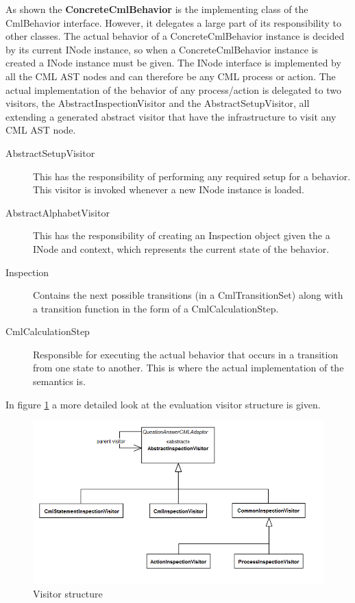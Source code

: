 \documentclass[a4paper, 10pt]{include/compassreport}   %
\begin{document}
As shown the \textbf{ConcreteCmlBehavior} is the implementing class of
the CmlBehavior interface. However, it delegates a large part of its
responsibility to other classes. The actual behavior of a
ConcreteCmlBehavior instance is decided by its current INode instance,
so when a ConcreteCmlBehavior instance is created a INode instance
must be given. The INode interface is implemented by all the CML AST
nodes and can therefore be any CML process or action.  The actual
implementation of the behavior of any process/action is delegated to
two visitors, the AbstractInspectionVisitor and the
AbstractSetupVisitor, all extending a generated abstract visitor that
have the infrastructure to visit any CML AST node.

\begin{description}
\item[AbstractSetupVisitor] This has the responsibility of performing
  any required setup for a behavior. This visitor is invoked
  whenever a new INode instance is loaded.

\item[AbstractAlphabetVisitor] This has the responsibility of creating
  an Inspection object given the a INode and context, which represents
  the current state of the behavior.
 
\item[Inspection] Contains the next possible transitions (in a
  CmlTransitionSet) along with a transition function in the form of a
  CmlCalculationStep. 

\item[CmlCalculationStep] Responsible for executing the actual
  behavior that occurs in a transition from one state to another. This
  is where the actual implementation of the semantics is.
\end{description} 



In figure \ref{fig:visitors} a more detailed look at the evaluation visitor structure is given.  

\begin{figure}[ht!]
  \begin{center}
    \includegraphics[width=1\textwidth]{figures/Visitors}
    \caption{Visitor structure}
    \label{fig:visitors}
  \end{center}
\end{figure}
\end{document}
